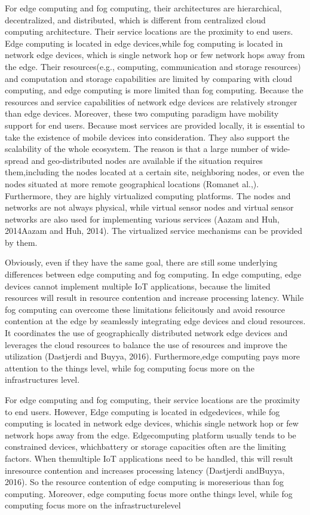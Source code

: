 For edge computing and fog computing, their architectures are hierarchical, decentralized, and distributed, which is different from centralized cloud computing architecture. 
Their service locations are the proximity to end users.
Edge computing is located in edge devices,while fog computing is located in network edge devices, which is single network hop or few network hops away from the edge. 
Their resources(e.g., computing, communication and storage resources) and computation and storage capabilities are limited by comparing with cloud computing, and edge computing is more limited than fog computing.
Because the resources and service capabilities of network edge devices are relatively stronger than edge devices. 
Moreover, these two computing paradigm have mobility support for end users. 
Because most services are provided locally, it is essential to take the existence of mobile devices into consideration. 
They also support the scalability of the whole ecosystem. 
The reason is that a large number of wide-spread and geo-distributed nodes are available if the situation requires them,including the nodes located at a certain site, neighboring nodes, or even the nodes situated at more remote geographical locations (Romanet al.,). 
Furthermore, they are highly virtualized computing platforms.
The nodes and networks are not always physical, while virtual sensor nodes and virtual sensor networks are also used for implementing various services (Aazam and Huh, 2014Aazam and Huh, 2014). 
The virtualized service mechanisms can be provided by them.

Obviously, even if they have the same goal, there are still some underlying differences between edge computing and fog computing. 
In edge computing, edge devices cannot implement multiple IoT applications, because the limited resources will result in resource contention and increase processing latency. 
While fog computing can overcome these limitations felicitously and avoid resource contention at the edge by seamlessly integrating edge devices and cloud resources. 
It coordinates the use of geographically distributed network edge devices and leverages the cloud resources to balance the use of resources and improve the utilization (Dastjerdi and Buyya, 2016). 
Furthermore,edge computing pays more attention to the things level, while fog computing focus more on the infrastructures level.

For edge computing and fog computing, their service locations are the proximity to end users. However, Edge computing is located in edgedevices, while fog computing is located in network edge devices, whichis single network hop or few network hops away from the edge. Edgecomputing platform usually tends to be constrained devices, whichbattery or storage capacities often are the limiting factors. When themultiple IoT applications need to be handled, this will result inresource contention and increases processing latency (Dastjerdi andBuyya, 2016). So the resource contention of edge computing is moreserious than fog computing. Moreover, edge computing focus more onthe things level, while fog computing focus more on the infrastructurelevel



